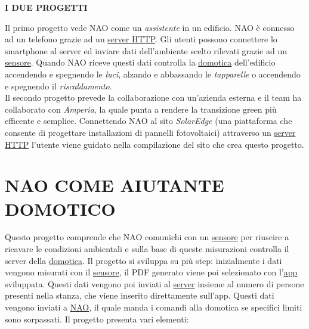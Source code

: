 \documentclass{optica-article}
\begin{document}
\begin{abstract*}
\bigskip

\noindent
\textbf{I DUE PROGETTI}

\bigskip
\noindent
Il primo progetto vede NAO come un \emph{assistente} in un edificio. NAO è connesso ad un telefono grazie ad un \hyperref[sec:domotics_server]{server HTTP}. Gli utenti possono connettere lo smartphone al server ed inviare dati dell'ambiente scelto rilevati grazie ad un \hyperref[sec:domotics_sensor]{sensore}. Quando NAO riceve questi dati controlla la \hyperref[sec:domotics_domotics_server]{domotica} dell'edificio accendendo e spegnendo le \emph{luci}, alzando e abbassando le \emph{tapparelle} o accendendo e spegnendo il \emph{riscaldamento}.\\


\vspace{7pt}
\noindent
Il secondo progetto prevede la collaborazione con un'azienda esterna e il team ha collaborato con \emph{Amperia}, la quale punta a rendere la transizione green più efficente e semplice. Connettendo NAO al sito \emph{SolarEdge} (una piattaforma che consente di progettare installazioni di pannelli fotovoltaici) attraverso un \hyperref[sec:solaedge_server]{server HTTP} l'utente viene guidato nella compilazione del sito che crea questo progetto.\\

\end{abstract*}


\section{NAO COME AIUTANTE DOMOTICO}\label{sec:domotics_project}
Questo progetto comprende che NAO comunichi con un \hyperref[sec:domotics_sensor]{sensore} per riuscire a ricavare le condizioni ambientali e sulla base di queste misurazioni controlla il 
server della \hyperref[sec:domotics_domotics_server]{domotica}. Il progetto si sviluppa su più step: inizialmente i dati vengono misurati con il \hyperref[sec:domotics_sensor]{sensore}, il PDF generato viene poi selezionato con l'\hyperref[sec:domotics_app]{app} sviluppata. Questi dati vengono poi inviati al \hyperref[sec:domotics_server]{server} insieme al numero di persone presenti nella stanza, che viene inserito direttamente sull'app. Questi dati vengono inviati a \hyperref[sec:domotics_nao]{NAO}, il quale manda i comandi alla domotica se specifici limiti sono sorpassati. Il progetto presenta vari elementi:\\
\end{document}
